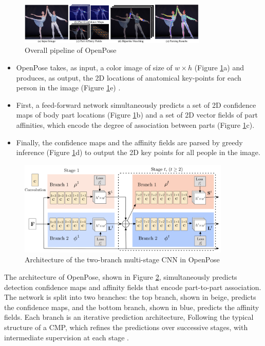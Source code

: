 \begin{figure}[htbp]
  \centering\includegraphics[width=0.8\textwidth]{./img/paf.png}
  \caption[Overall pipeline of OpenPose]{Overall pipeline of OpenPose \cite{cao2017realtime}}\label{fig:paf}
\end{figure}

\begin{itemize}
\item OpenPose takes, as input, a color image of size of $w \times h$ (Figure \ref{fig:paf}a) and produces, as output, the 2D locations of anatomical key-points for each person in the image (Figure \ref{fig:paf}e) \cite{cao2017realtime}.
\item First, a feed-forward network simultaneously predicts a set of 2D confidence maps of body part locations (Figure \ref{fig:paf}b) and a set of 2D vector fields of part affinities, which encode the degree of association between parts (Figure \ref{fig:paf}c).
\item Finally, the confidence maps and the affinity fields are parsed by greedy inference (Figure \ref{fig:paf}d) to output the 2D key points for all people in the image.
\end{itemize}

\begin{figure}[!htbp]
\centering\includegraphics[width=0.9\textwidth]{./img/OpenPoseArchitecture.png}
  \caption[Architecture of the two-branch multi-stage CNN in OpenPose]{Architecture of the two-branch multi-stage CNN in OpenPose \cite{cao2017realtime}}\label{fig:architecture}
\end{figure}

\par The architecture of OpenPose, shown in Figure \ref{fig:architecture}, simultaneously predicts detection confidence maps and affinity fields that encode part-to-part association. The network is split into two branches: the top branch, shown in beige, predicts the confidence maps, and the bottom branch, shown in blue, predicts the affinity fields. Each branch is an iterative prediction architecture, Following the typical structure of a CMP, which refines the predictions over successive stages, with intermediate supervision at each stage \cite{cao2017realtime}.

